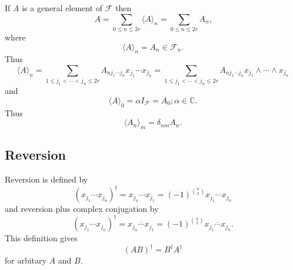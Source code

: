 \documentclass[aps, preprint]{revtex4}
\begin{document}
\bigskip If $A$ is a general element of $\mathcal{F}$ then
\begin{equation}A =\sum _{0 \leq n \leq 2 r} \langle A \rangle _{n} =\sum _{0 \leq n \leq 2 r}A_{n}\text{,}
\end{equation}where
\begin{equation} \langle A \rangle _{n} =A_{n} \in \mathcal{F}_{n}\text{.}
\end{equation}Thus
\begin{equation} \langle A \rangle _{n} =\sum _{1 \leq j_{1} <\cdots  <j_{n} \leq 2 r}A_{n j_{1} \cdots  j_{n}} x_{j_{1}} \cdots  x_{j_{n}} =\sum _{1 \leq j_{1} <\cdots  <j_{n} \leq 2 r}A_{n j_{1} \cdots  j_{n}} x_{j_{1}} \wedge \cdots  \wedge x_{j_{n}}
\end{equation}and
\begin{equation} \langle A \rangle _{0} =\alpha  I_{\mathcal{F}} =A_{0} ;\alpha  \in \mathbb{C}\text{.}
\end{equation}Thus
\begin{equation} \langle A_{n} \rangle _{m} =\delta _{n m} A_{n}\text{.}
\end{equation}

\subsection{Reversion}
\qquad Reversion is defined by
\begin{equation}\left (x_{j_{1}} \cdots  x_{j_{n}}\right )^{t} =x_{j_{n}} \cdots  x_{j_{1}} =\left ( -1\right )^{\binom{n}{2}} x_{j_{1}} \cdots  x_{j_{n}}
\end{equation}and reversion plus complex conjugation by
\begin{equation}\left (x_{j_{1}} \cdots  x_{j_{n}}\right )^{ \dag } =\overline{x_{j_{n}} \cdots  x_{j_{1}}} =\left ( -1\right )^{\binom{n}{2}} \overline{x_{j_{1}} \cdots  x_{j_{n}}}\text{.}
\end{equation}This definition gives
\begin{equation}\left (A B\right )^{ \dag } =B^{ \dag } A^{ \dag }
\end{equation}for arbitary $A$ and $B\text{.}$ 
\end{document}
